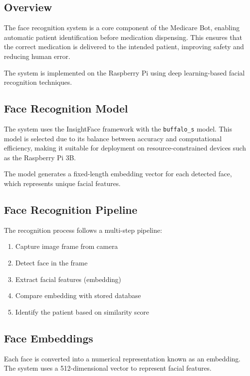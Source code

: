 
\subsection{Overview}

The face recognition system is a core component of the Medicare Bot, enabling automatic patient identification before medication dispensing. This ensures that the correct medication is delivered to the intended patient, improving safety and reducing human error.

The system is implemented on the Raspberry Pi using deep learning-based facial recognition techniques.

\subsection{Face Recognition Model}

The system uses the InsightFace framework with the \texttt{buffalo\_s} model. This model is selected due to its balance between accuracy and computational efficiency, making it suitable for deployment on resource-constrained devices such as the Raspberry Pi 3B.

The model generates a fixed-length embedding vector for each detected face, which represents unique facial features.

\subsection{Face Recognition Pipeline}

The recognition process follows a multi-step pipeline:

\begin{enumerate}
    \item Capture image frame from camera
    \item Detect face in the frame
    \item Extract facial features (embedding)
    \item Compare embedding with stored database
    \item Identify the patient based on similarity score
\end{enumerate}

\subsection{Face Embeddings}

Each face is converted into a numerical representation known as an embedding. The system uses a 512-dimensional vector to represent facial features.

